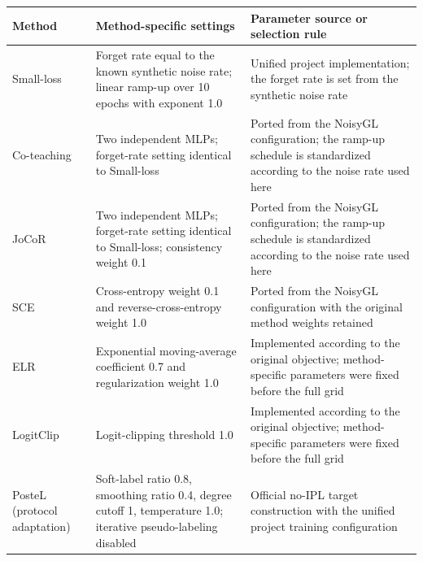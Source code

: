 {\def\LTcaptype{none} %
\begin{longtable}[]{@{}
  >{\raggedright\arraybackslash}p{}
  >{\centering\arraybackslash}p{}
  >{\centering\arraybackslash}p{}@{}}
\toprule\noalign{}
\begin{minipage}[b]{\linewidth}\raggedright
\textbf{Method}
\end{minipage} & \begin{minipage}[b]{\linewidth}\centering
\textbf{Method-specific settings}
\end{minipage} & \begin{minipage}[b]{\linewidth}\centering
\textbf{Parameter source or selection rule}
\end{minipage} \\
\midrule\noalign{}
\endhead
\bottomrule\noalign{}
\endlastfoot
Small-loss & Forget rate equal to the known synthetic noise rate; linear ramp-up over 10 epochs with exponent 1.0 & Unified project implementation; the forget rate is set from the synthetic noise rate \\
Co-teaching & Two independent MLPs; forget-rate setting identical to Small-loss & Ported from the NoisyGL configuration; the ramp-up schedule is standardized according to the noise rate used here \\
JoCoR & Two independent MLPs; forget-rate setting identical to Small-loss; consistency weight 0.1 & Ported from the NoisyGL configuration; the ramp-up schedule is standardized according to the noise rate used here \\
SCE & Cross-entropy weight 0.1 and reverse-cross-entropy weight 1.0 & Ported from the NoisyGL configuration with the original method weights retained \\
ELR & Exponential moving-average coefficient 0.7 and regularization weight 1.0 & Implemented according to the original objective; method-specific parameters were fixed before the full grid \\
LogitClip & Logit-clipping threshold 1.0 & Implemented according to the original objective; method-specific parameters were fixed before the full grid \\
PosteL (protocol adaptation) & Soft-label ratio 0.8, smoothing ratio 0.4, degree cutoff 1, temperature 1.0; iterative pseudo-labeling disabled & Official no-IPL target construction with the unified project training configuration \\

\end{longtable}}
